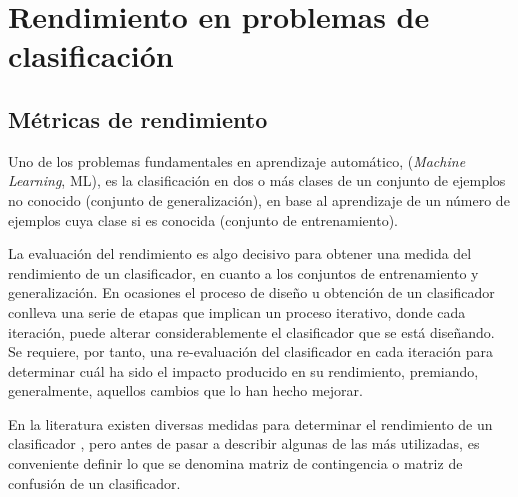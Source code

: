 \chapter{Rendimiento en problemas de clasificación}\label{medidasRendimiento}

\section{Métricas de rendimiento}\label{2.1}
\noindent Uno de los problemas fundamentales en aprendizaje automático, (\textit{Machine
Learning},
ML), es la
clasificación en dos o más clases de un conjunto de ejemplos no conocido (conjunto de
generalización), en base al aprendizaje de un número de ejemplos
cuya	clase	si es conocida (conjunto de entrenamiento).

La evaluación del rendimiento es algo decisivo para obtener una medida del
rendimiento de un clasificador, en cuanto a los conjuntos de entrenamiento y
generalización. En ocasiones el proceso de diseño u obtención de un clasificador conlleva
una serie de etapas que implican un proceso iterativo, donde cada	iteración, puede alterar
considerablemente el clasificador que se está diseñando. Se requiere, por tanto, una
re-evaluación del clasificador en cada iteración para determinar cuál ha sido el	impacto
producido en su rendimiento, premiando, generalmente, aquellos cambios que lo han hecho
mejorar.

En la literatura existen diversas medidas para determinar el
rendimiento de un clasificador \cite{Duda2000,Caruana2004,Sokolova2009}, pero
antes de pasar a describir algunas de las más utilizadas, es conveniente definir lo que se
denomina matriz de contingencia o matriz de confusión de un clasificador.

